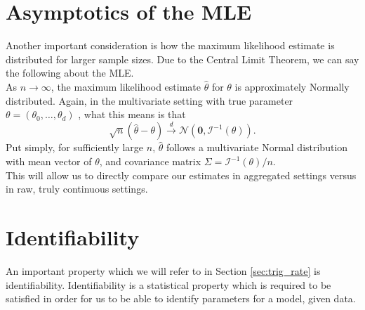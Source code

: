 \documentclass[11pt,a4,twosided,singlespacing,titlepagenumber=on,numbers=endperiod]{scrreprt}
\numberwithin{equation}{chapter} %
\theoremstyle{remark}
\begin{document}
\section{Asymptotics of the MLE}\label{sec:asymptotics}
Another important consideration is how the maximum likelihood estimate is distributed for larger sample sizes. Due to the Central Limit Theorem, we can say the following about the MLE. \\
As $n \to \infty$, the maximum likelihood estimate $\hat{\theta}$ for $\theta$ is approximately Normally distributed. Again, in the multivariate setting with true parameter $\theta = (\theta_0, \dots, \theta_d)$ \cite{young_smith_2005}, what this means is that
\begin{equation*}
	\sqrt{n}(\hat{\theta} - \theta) \xrightarrow{d} \mathcal{N}\left(\mathbf{0}, \mathcal{I}^{-1}(\theta) \right).
\end{equation*}
Put simply, for sufficiently large $n$, $\hat{\theta}$ follows a multivariate Normal distribution with mean vector of $\theta$, and covariance matrix $\Sigma = \mathcal{I}^{-1}(\theta)/n$. \\
This will allow us to directly compare our estimates in aggregated settings versus in raw, truly continuous settings.

\section{Identifiability}\label{sec:identifiability}
An important property which we will refer to in Section \ref{sec:trig_rate} is identifiability. Identifiability is a statistical property which is required to be satisfied in order for us to be able to identify parameters for a model, given data.
\end{document}
